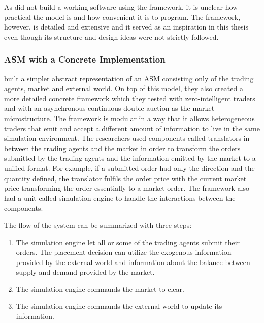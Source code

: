 
As \citet{Ben12} did not build a working software using the framework, it is unclear 
how practical the model is and how convenient it is to program. The framework, 
however, is detailed and extensive and it served as an inspiration in this thesis even though 
its structure and design ideas were not strictly followed. 


\subsubsection{ASM with a Concrete Implementation}
\citet{Julien07} built a simpler abstract representation of an ASM consisting 
only of the trading agents, market and external world. On top of this model, 
they also created a more detailed concrete framework which they tested with 
zero-intelligent traders and with an asynchronous continuous double auction as the market 
microstructure. The framework is modular in a way that it allows heterogeneous traders 
that emit and accept a different amount of information to live in the same 
simulation environment. The researchers used components called translators in between the 
trading agents and the market in order to transform the orders submitted by
the trading agents and the information emitted by the market to a unified format.
For example, if a submitted order had only the direction and the quantity 
defined, the translator fulfils the order price with the current market price 
transforming the order essentially to a market order. The framework also had a
unit called simulation engine to handle the interactions between the components.

The flow of the system can be summarized with three steps:
\begin{enumerate}
    \item The simulation engine let all or some of the trading agents submit their orders. 
            The placement decision can utilize the exogenous information provided by the 
            external world and information about the balance between supply and demand 
            provided by the market.
    \item The simulation engine commands the market to clear.
    \item The simulation engine commands the external world to update its information.
\end{enumerate}


